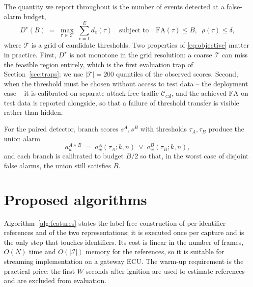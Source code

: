 \documentclass[preprint,11pt,authoryear]{elsarticle}
\newcommand{\FA}{\mathrm{FA}}
\begin{document}
The quantity we report throughout is the number of events detected at a false-alarm budget,
\begin{equation}
D^\star(B) \;=\; \max_{\tau\,\in\,\mathcal{T}}\; \sum_{e=1}^{E} d_e(\tau)
\quad\text{subject to}\quad \FA(\tau)\le B,\;\; \rho(\tau)\le\delta ,
\label{eq:objective}
\end{equation}
where $\mathcal{T}$ is a grid of candidate thresholds. Two properties of
\eqref{eq:objective} matter in practice. First, $D^\star$ is not monotone in the grid resolution:
a coarse $\mathcal{T}$ can miss the feasible region entirely, which is the first evaluation trap of
Section~\ref{sec:traps}; we use $|\mathcal{T}|=200$ quantiles of the observed scores. Second, when
the threshold must be chosen without access to test data -- the deployment case -- it is calibrated
on separate attack-free traffic $\mathcal{C}_{\mathrm{cal}}$, and the achieved $\FA$ on test data is
reported alongside, so that a failure of threshold transfer is visible rather than hidden.

For the paired detector, branch scores $s^A,s^B$ with thresholds $\tau_A,\tau_B$ produce the union
alarm
\begin{equation}
a^{A\vee B}_w \;=\; a^A_w(\tau_A;k,n)\;\vee\;a^B_w(\tau_B;k,n),
\label{eq:union}
\end{equation}
and each branch is calibrated to budget $B/2$ so that, in the worst case of disjoint false alarms,
the union still satisfies $B$.

\section{Proposed algorithms}
\label{sec:algo}

Algorithm~\ref{alg:features} states the label-free construction of per-identifier references and of
the two representations; it is executed once per capture and is the only step that touches
identifiers. Its cost is linear in the number of frames, $O(N)$ time and $O(|\mathcal{I}|)$ memory
for the references, so it is suitable for streaming implementation on a gateway ECU. The warm-up
requirement is the practical price: the first $W$ seconds after ignition are used to estimate
references and are excluded from evaluation.
\end{document}
